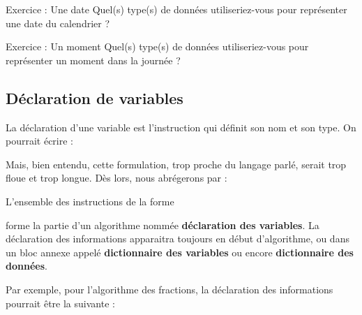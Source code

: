 			
			\begin{Emphase}[exercice]{Exercice : Une date}
				Quel(s) type(s) de données utiliseriez-vous 
				pour représenter une date du calendrier ?
			\end{Emphase}

			
			\begin{Emphase}[exercice]{Exercice : Un moment}
			Quel(s) type(s) de données utiliseriez-vous 
			pour représenter un moment dans la journée ?
			\end{Emphase}

		\subsection{Déclaration de variables}

			La déclaration d’une variable est l’instruction 
			qui définit son nom et son type. On pourrait écrire :

			
			Mais, bien entendu, cette formulation, trop proche du
			langage parlé, serait trop floue et trop longue. 
			Dès lors, nous abrégerons par :


			L’ensemble des instructions de la forme


			forme la partie d’un algorithme nommée 
			\textbf{déclaration des variables}. 
			La déclaration des informations apparaitra toujours en
			début d’algorithme, ou dans un bloc annexe appelé 
			\textbf{dictionnaire des variables} 
			ou encore \textbf{dictionnaire des données}.

			Par exemple, pour l’algorithme des fractions, la déclaration des
			informations pourrait être la suivante :


